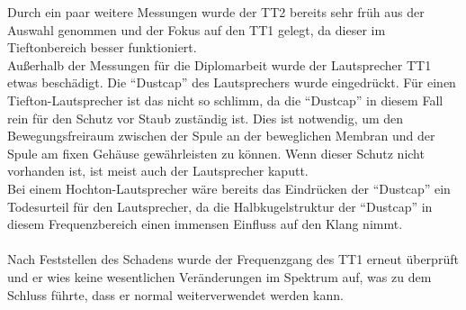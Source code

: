 \newpage
Durch ein paar weitere Messungen wurde der TT2 bereits sehr früh aus der Auswahl genommen und der Fokus auf den TT1 gelegt, da dieser im Tieftonbereich besser funktioniert.
\\
Außerhalb der Messungen für die Diplomarbeit wurde der Lautsprecher TT1 etwas beschädigt.
Die \enquote{Dustcap} des Lautsprechers wurde eingedrückt.
Für einen Tiefton-Lautsprecher ist das nicht so schlimm, da die \enquote{Dustcap} in diesem Fall rein für den Schutz vor Staub zuständig ist.
Dies ist notwendig, um den Bewegungsfreiraum zwischen der Spule an der beweglichen Membran und der Spule am fixen Gehäuse gewährleisten zu können.
Wenn dieser Schutz nicht vorhanden ist, ist meist auch der Lautsprecher kaputt.\\
Bei einem Hochton-Lautsprecher wäre bereits das Eindrücken der \enquote{Dustcap} ein Todesurteil für den Lautsprecher, da die Halbkugelstruktur der \enquote{Dustcap} in diesem Frequenzbereich einen immensen Einfluss auf den Klang nimmt.
\\ \\
Nach Feststellen des Schadens wurde der Frequenzgang des TT1 erneut überprüft und er wies keine wesentlichen Veränderungen im Spektrum auf, was zu dem Schluss führte, dass er normal weiterverwendet werden kann.
\\













